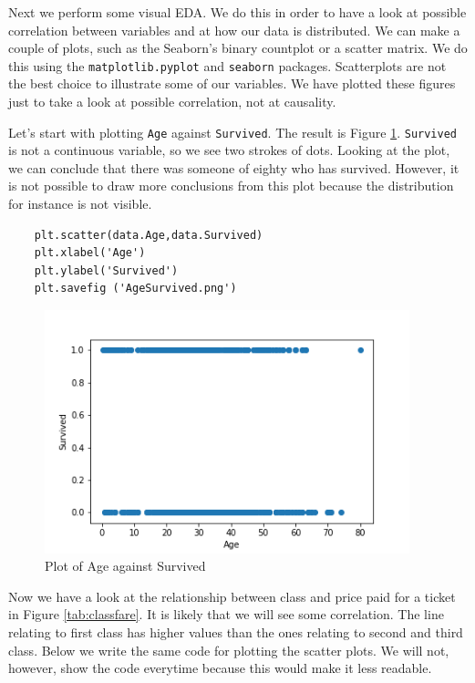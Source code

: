 \documentclass[11pt]{article}
\begin{document}
Next we perform some visual EDA. We do this in order to have a look at possible correlation between variables and at how our data is distributed. We can make a couple of plots, such as the Seaborn's binary countplot or a scatter matrix. We do this using the \texttt{matplotlib.pyplot} and \texttt{seaborn} packages. Scatterplots are not the best choice to illustrate some of our variables. We have plotted these figures just to take a look at possible correlation, not at causality.

Let's start with plotting \texttt{Age} against \texttt{Survived}. The result is Figure \ref{tab:agesurvived}. \texttt{Survived} is not a continuous variable, so we see two strokes of dots. Looking at the plot, we can conclude that there was someone of eighty who has survived. However, it is not possible to draw more conclusions from this plot because the distribution for instance is not visible. 
\begin{verbatim}
    plt.scatter(data.Age,data.Survived)
    plt.xlabel('Age')
    plt.ylabel('Survived')
    plt.savefig ('AgeSurvived.png')
\end{verbatim}

\begin{figure}[htbp]
\centering
\includegraphics[width=400px]{./AgeSurvived.png}
\caption{\label{tab:agesurvived}
Plot of Age against Survived}
\end{figure}
Now we have a look at the relationship between class and price paid for a ticket in Figure \ref{tab:classfare}. It is likely that we will see some correlation. The line relating to first class has higher values than the ones relating to second and third class. Below we write the same code for plotting the scatter plots. We will not, however, show the code everytime because this would make it less readable.
\end{document}
